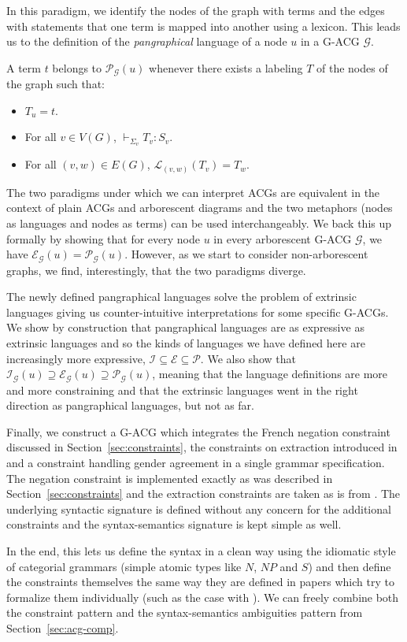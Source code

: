 \documentclass[twocolumn]{article}
\begin{document}
In this paradigm, we identify the nodes of the graph with terms and the
edges with statements that one term is mapped into another using a
lexicon. This leads us to the definition of the \emph{pangraphical}
language of a node $u$ in a G-ACG $\mathcal{G}$.

A term $t$ belongs to $\mathcal{P}_{\mathcal{G}}(u)$ whenever there
exists a labeling $T$ of the nodes of the graph such that:

\begin{itemize}
  \item $T_u = t$.
  \item For all $v \in V(G)$, $\vdash_{\Sigma_v} T_v : S_v$.
  \item For all $(v,w) \in E(G)$, $\mathcal{L}_{(v,w)}(T_v) = T_w$.
\end{itemize}

The two paradigms under which we can interpret ACGs are equivalent in
the context of plain ACGs and arborescent diagrams and the two metaphors
(nodes as languages and nodes as terms) can be used interchangeably. We
back this up formally by showing that for every node $u$ in every
arborescent G-ACG $\mathcal{G}$, we have $\mathcal{E}_{\mathcal{G}}(u) =
\mathcal{P}_{\mathcal{G}}(u)$. However, as we start to consider
non-arborescent graphs, we find, interestingly, that the two paradigms
diverge.

The newly defined pangraphical languages solve the problem of extrinsic
languages giving us counter-intuitive interpretations for some specific
G-ACGs. We show by construction that pangraphical languages are as
expressive as extrinsic languages and so the kinds of languages we have
defined here are increasingly more expressive, $\mathcal{I} \subseteq
\mathcal{E} \subseteq \mathcal{P}$. We also show that
$\mathcal{I}_{\mathcal{G}}(u) \supseteq \mathcal{E}_{\mathcal{G}}(u)
\supseteq \mathcal{P}_{\mathcal{G}}(u)$, meaning that the language
definitions are more and more constraining and that the extrinsic
languages went in the right direction as pangraphical languages, but not
as far.

Finally, we construct a G-ACG which integrates the French negation
constraint discussed in Section~\ref{sec:constraints}, the constraints
on extraction introduced in \cite{pogodalla2012controlling} and a
constraint handling gender agreement in a single grammar
specification. The negation constraint is implemented exactly as was
described in Section~\ref{sec:constraints} and the extraction
constraints are taken as is from \cite{pogodalla2012controlling}. The
underlying syntactic signature is defined without any concern for the
additional constraints and the syntax-semantics signature is kept simple
as well.

In the end, this lets us define the syntax in a clean way using the
idiomatic style of categorial grammars (simple atomic types like $N$,
$NP$ and $S$) and then define the constraints themselves the same way
they are defined in papers which try to formalize them individually
(such as the case with \cite{pogodalla2012controlling}). We can freely
combine both the constraint pattern and the syntax-semantics ambiguities
pattern from Section~\ref{sec:acg-comp}.



\end{document}

